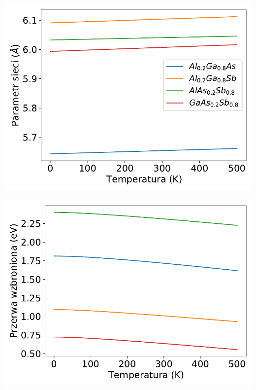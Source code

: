 \documentclass[12pt,openany,a4paper]{book}
\begin{document}
\begin{minipage}[t]{0.5\textwidth}
	\includegraphics[width = \linewidth]{Figures/strain/ter_alc1.pdf}\label{fig:ter_alc1}
\end{minipage}
\begin{minipage}[t]{0.5\textwidth}
	\includegraphics[width = \linewidth]{Figures/strain/ter_eg1.pdf}\label{fig:ter_eg1}
\end{minipage}
\end{document}
